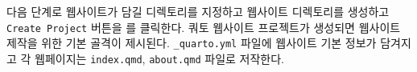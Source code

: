 \documentclass[
  letterpaper,
]{book}
\begin{document}
다음 단계로 웹사이트가 담길 디렉토리를 지정하고 웹사이트 디렉토리를
생성하고 \texttt{Create\ Project} 버튼을 를 클릭한다. 쿼토 웹사이트
프로젝트가 생성되면 웹사이트 제작을 위한 기본 골격이 제시된다.
\texttt{\_quarto.yml} 파일에 웹사이트 기본 정보가 담겨지고 각 웹페이지는
\texttt{index.qmd}, \texttt{about.qmd} 파일로 저작한다.

\begin{figure}

\begin{minipage}[t]{0.30\linewidth}

{\centering 


}

\end{minipage}%
%
\begin{minipage}[t]{0.01\linewidth}

{\centering 

~

}

\end{minipage}%
%
\begin{minipage}[t]{0.69\linewidth}

{\centering 

}
\end{minipage}
\end{figure}
\end{document}
